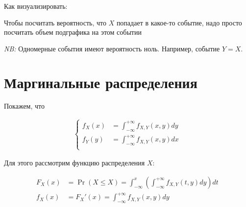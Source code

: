 \documentclass[12pt]{article}
\begin{document}
Как визуализировать:

\begin{center}
\end{center}

Чтобы посчитать вероятность, что $X$ попадает в какое-то событие, надо просто посчитать объем подграфика на этом событии

\emph{NB:} Одномерные события имеют вероятность ноль. Например, событие $Y = X$.

\section{Маргинальные распределения}
 Покажем, что 

 \begin{align*}
   \begin{cases}
    f_X(x) &= \int_{-\infty}^{+\infty} f_{X, Y}(x, y) dy \\
    f_Y(y) &= \int_{-\infty}^{+\infty} f_{X, Y}(x, y) dx \\
   \end{cases}
 \end{align*}

 Для этого рассмотрим функцию распределения $X$:

\begin{align*}
  F_X(x) &= \Pr(X \le X) = \int_{-\infty}^x \left(\int_{-\infty}^{+\infty} f_{X, Y} (t, y) dy\right) dt \\
  f_X(x) &= F_X'(x) = \int_{-\infty}^{+\infty} f_{X, Y} (x, y) dy
\end{align*}
\end{document}
